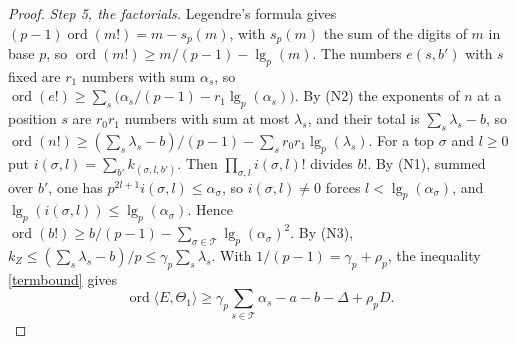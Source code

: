 \begin{proof}
\emph{Step 5, the factorials.} Legendre's formula gives $(p-1)\operatorname{ord}(m!)=m-s_p(m)$, with $s_p(m)$ the sum of the digits of $m$ in base $p$, so $\operatorname{ord}(m!)\ge m/(p-1)-\operatorname{lg}_p(m)$. The numbers $e(s,b')$ with $s$ fixed are $r_1$ numbers with sum $\alpha_s$, so $\operatorname{ord}(e!)\ge\sum_s\big(\alpha_s/(p-1)-r_1\operatorname{lg}_p(\alpha_s)\big)$. By (N2) the exponents of $n$ at a position $s$ are $r_0r_1$ numbers with sum at most $\lambda_s$, and their total is $\sum_s\lambda_s-b$, so $\operatorname{ord}(n!)\ge(\sum_s\lambda_s-b)/(p-1)-\sum_sr_0r_1\operatorname{lg}_p(\lambda_s)$. For a top $\sigma$ and $l\ge0$ put $i(\sigma,l)=\sum_{b'}k_{(\sigma,l,b')}$. Then $\prod_{\sigma,l}i(\sigma,l)!$ divides $b!$. By (N1), summed over $b'$, one has $p^{2l+1}i(\sigma,l)\le\alpha_\sigma$, so $i(\sigma,l)\ne0$ forces $l<\operatorname{lg}_p(\alpha_\sigma)$, and $\operatorname{lg}_p(i(\sigma,l))\le\operatorname{lg}_p(\alpha_\sigma)$. Hence $\operatorname{ord}(b!)\ge b/(p-1)-\sum_{\sigma\in\mathcal T}\operatorname{lg}_p(\alpha_\sigma)^2$. By (N3), $k_Z\le(\sum_s\lambda_s-b)/p\le\gamma_p\sum_s\lambda_s$. With $1/(p-1)=\gamma_p+\rho_p$, the inequality \eqref{termbound} gives
\begin{equation}\label{star}
\operatorname{ord}\langle E,\Theta_1\rangle\ge\gamma_p\sum_{s\in\mathcal T}\alpha_s-a-b-\Delta+\rho_pD .
\end{equation}


\end{proof}
